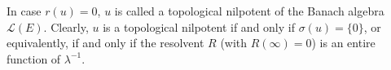 In case $r(u) = 0$, $u$ is called a topological nilpotent of the Banach algebra $\mathcal{L}(E)$. Clearly, $u$ is a topological nilpotent if and only if $\sigma(u) = \{0\}$, or equivalently, if and only if the resolvent $R$ (with $R(\infty) = 0$) is an entire function of $\lambda^{-1}$.
